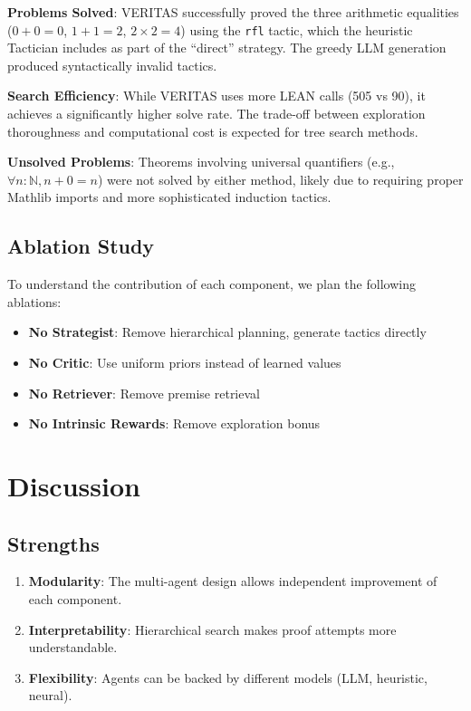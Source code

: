 \documentclass[11pt]{article}
\begin{document}
\textbf{Problems Solved}: VERITAS successfully proved the three arithmetic equalities ($0+0=0$, $1+1=2$, $2 \times 2 = 4$) using the \texttt{rfl} tactic, which the heuristic Tactician includes as part of the ``direct'' strategy. The greedy LLM generation produced syntactically invalid tactics.

\textbf{Search Efficiency}: While VERITAS uses more LEAN calls (505 vs 90), it achieves a significantly higher solve rate. The trade-off between exploration thoroughness and computational cost is expected for tree search methods.

\textbf{Unsolved Problems}: Theorems involving universal quantifiers (e.g., $\forall n : \mathbb{N}, n + 0 = n$) were not solved by either method, likely due to requiring proper Mathlib imports and more sophisticated induction tactics.

\subsection{Ablation Study}

To understand the contribution of each component, we plan the following ablations:
\begin{itemize}
    \item \textbf{No Strategist}: Remove hierarchical planning, generate tactics directly
    \item \textbf{No Critic}: Use uniform priors instead of learned values
    \item \textbf{No Retriever}: Remove premise retrieval
    \item \textbf{No Intrinsic Rewards}: Remove exploration bonus
\end{itemize}

\section{Discussion}

\subsection{Strengths}

\begin{enumerate}
    \item \textbf{Modularity}: The multi-agent design allows independent improvement of each component.
    \item \textbf{Interpretability}: Hierarchical search makes proof attempts more understandable.
    \item \textbf{Flexibility}: Agents can be backed by different models (LLM, heuristic, neural).
\end{enumerate}
\end{document}
